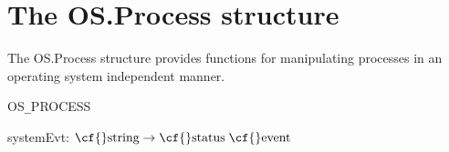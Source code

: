 \maybeclearpage
\section{The {\cf OS.\-Process} structure}


The {\cf \small OS.\-Process} structure provides functions for manipulating processes in an  operating system independent manner. 
\begin{synopsis}
\item {} \label{sig-CML_OS_PROCESS}
\item {\STRUCTURE} \label{str-OS.Process}
\end{synopsis}

\begin{interface}
\Nopagebreak
\item {}{\cf OS{\tt\_}\linebreak[0]PROCESS}\Nopagebreak
\item {}{} {\cf systemEvt: \(\mbox{\cf{}string}\rightarrow \mbox{\cf{}status}\;\mbox{\cf{}event}\)}

\end{interface}


